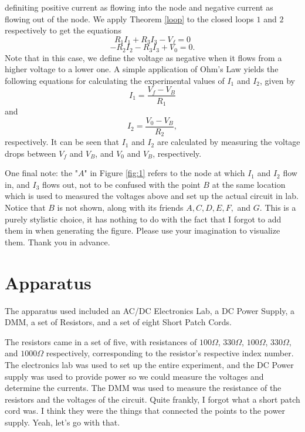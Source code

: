 \documentclass{article}
\begin{document}
definiting positive current as flowing into the node and negative current as flowing out of the node.
We apply Theorem \ref{loop} to the closed loops $1$ and $2$ respectively to get the equations
\begin{equation}\label{eq:2}
    R_1 I_1 + R_3 I_3 - V_f = 0
\end{equation}
\begin{equation}\label{eq:3}
    -R_2 I_2 - R_3 I_3 + V_0 = 0.
\end{equation}
Note that in this case, we define the voltage as negative when it flows from a higher voltage to a lower one.
A simple application of Ohm's Law yields the following equations for calculating the experimental values of $I_1$ and $I_2$, given by
\begin{equation}\label{eq:4}
    I_1 = \frac{V_f - V_B}{R_1}
\end{equation}
and 
\begin{equation} \label{eq:5}
    I_2 = \frac{V_0 - V_B}{R_2},
\end{equation}
respectively. It can be seen that $I_1$ and $I_2$ are calculated by measuring the voltage drops between $V_f$ and $V_B$, and $V_0$ and $V_B$, respectively.

One final note: the "$A$" in Figure \ref{fig:1} refers to the node at which $I_1$ and $I_2$ flow in, and $I_3$ flows out, not to be confused with the point $B$ at the same location
which is used to measured the voltages above and set up the actual circuit in lab. Notice that $B$ is not shown, along with its friends
$A,C,D,E,F,$ and $G$. This is a purely stylistic choice, it has nothing to do with the fact that I forgot to add them in when generating the figure. Please 
use your imagination to visualize them. Thank you in advance. 
\section{Apparatus}
The apparatus used included an AC/DC Electronics Lab, a DC Power Supply, a DMM, a set of Resistors, and a set of 
eight Short Patch Cords.

The resistors came in a set of five, with resistances of $100\Omega$, $330\Omega$, $100\Omega$, $330\Omega$, and $1000\Omega$ respectively, corresponding to the resistor's respective index number.
The electronics lab was used to set up the entire experiment, and the DC Power supply was used to provide power so we could measure the voltages and determine the currents.
The DMM was used to measure the resistance of the resistors and the voltages of the circuit. 
Quite frankly, I forgot what a short patch cord was. I think they were the things that connected
the points to the power supply. Yeah, let's go with that. 
\end{document}
